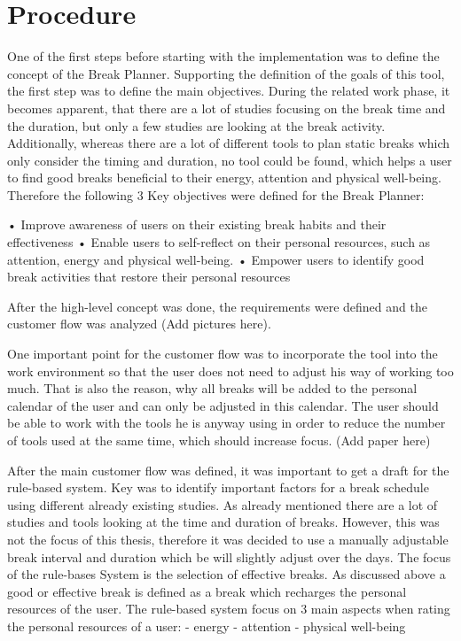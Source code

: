 \documentclass{hasel_thesis}
\begin{document}
\section{Procedure}
One of the first steps before starting with the implementation was to define the concept of the Break Planner. Supporting the definition of the goals of this tool, the first step was to define the main objectives. During the related work phase, it becomes apparent, that there are a lot of studies focusing on the break time and the duration, but only a few studies are looking at the break activity. Additionally,  whereas there are a lot of different tools to plan static breaks which only consider the timing and duration, no tool could be found, which helps a user to find good breaks beneficial to their energy, attention and physical well-being. Therefore the following 3 Key objectives were defined for the Break Planner:

•	Improve awareness of users on their existing break habits and their effectiveness
•	Enable users to self-reflect on their personal resources, such as attention, energy and physical well-being.
•	Empower users to identify good break activities that restore their personal resources

After the high-level concept was done, the requirements were defined and the customer flow was analyzed (Add pictures here).

One important point for the customer flow was to incorporate the tool into the work environment so that the user does not need to adjust his way of working too much. That is also the reason, why all breaks will be added to the personal calendar of the user and can only be adjusted in this calendar. The user should be able to work with the tools he is anyway using in order to reduce the number of tools used at the same time, which should increase focus. (Add paper here)

After the main customer flow was defined, it was important to get a draft for the rule-based system. Key was to identify important factors for a break schedule using different already existing studies. As already mentioned there are a lot of studies and tools looking at the time and duration of breaks. However, this was not the focus of this thesis, therefore it was decided to use a manually adjustable break interval and duration which be will slightly adjust over the days. The focus of the rule-bases System is the selection of effective breaks. As discussed above a good or effective break is defined as a break which recharges the personal resources of the user. The rule-based system  focus on 3 main aspects when rating the personal resources of a user:
- energy
- attention
- physical well-being
\end{document}
